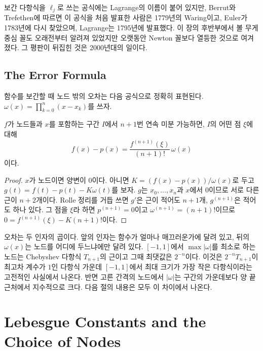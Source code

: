\begin{aside}
보간 다항식을 $\ell_j$로 쓰는 공식에는 Lagrange의 이름이 붙어 있지만, Berrut와 Trefethen에 따르면 이 공식을 처음 발표한 사람은 1779년의 Waring이고, Euler가 1783년에 다시 찾았으며, Lagrange는 1795년에 발표했다\cite{berrut2004barycentric}. 이 장의 후반부에서 볼 무게중심 꼴도 오래전부터 알려져 있었지만 오랫동안 Newton 꼴보다 열등한 것으로 여겨졌다. 그 평판이 뒤집힌 것은 2000년대의 일이다.
\end{aside}

\subsection{The Error Formula}

함수를 보간할 때 노드 밖의 오차는 다음 공식으로 정확히 표현된다.  $\omega(x)=\prod_{k=0}^n(x-x_k)$를 쓰자.

\begin{theorem}
\label{thm:interp-error}
$f$가 노드들과 $x$를 포함하는 구간 $I$에서 $n+1$번 연속 미분 가능하면, $I$의 어떤 점 $\xi$에 대해
\[
f(x)-p(x)=\frac{f^{(n+1)}(\xi)}{(n+1)!}\,\omega(x)
\]
이다.
\end{theorem}

\begin{proof}
$x$가 노드이면 양변이 $0$이다. 아니면 $K=(f(x)-p(x))/\omega(x)$로 두고 $g(t)=f(t)-p(t)-K\omega(t)$를 보자. $g$는 $x_0,\dots,x_n$과 $x$에서 $0$이므로 서로 다른 근이 $n+2$개이다. Rolle 정리를 거듭 쓰면 $g'$은 근이 적어도 $n+1$개, $g^{(n+1)}$은 적어도 하나 있다. 그 점을 $\xi$라 하면 $p^{(n+1)}=0$이고 $\omega^{(n+1)}=(n+1)!$이므로 $0=f^{(n+1)}(\xi)-K(n+1)!$이다.
\end{proof}

오차는 두 인자의 곱이다. 앞의 인자는 함수가 얼마나 매끄러운가에 달려 있고, 뒤의 $\omega(x)$는 노드를 어디에 두느냐에만 달려 있다. $[-1,1]$에서 $\max|\omega|$를 최소로 하는 노드는 Chebyshev 다항식 $T_{n+1}$의 근이고 그때 최댓값은 $2^{-n}$이다. 이것은 $2^{-n}T_{n+1}$이 최고차 계수가 $1$인 다항식 가운데 $[-1,1]$에서 최대 크기가 가장 작은 다항식이라는 고전적인 사실에서 나온다\cite{trefethen2019atap}. 반면 고른 간격의 노드에서 $|\omega|$는 구간의 가운데보다 양 끝 근처에서 지수적으로 크다. 다음 절의 내용은 모두 이 차이에서 나온다.

\section{Lebesgue Constants and the Choice of Nodes}
\label{sec:lebesgue}

